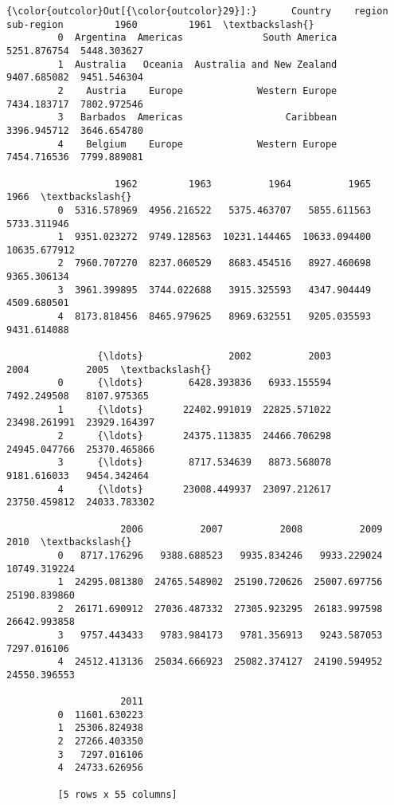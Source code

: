 \documentclass[11pt]{article}
\begin{document}
\begin{Verbatim}[commandchars=\\\{\}]
{\color{outcolor}Out[{\color{outcolor}29}]:}      Country    region                 sub-region         1960         1961  \textbackslash{}
         0  Argentina  Americas              South America  5251.876754  5448.303627   
         1  Australia   Oceania  Australia and New Zealand  9407.685082  9451.546304   
         2    Austria    Europe             Western Europe  7434.183717  7802.972546   
         3   Barbados  Americas                  Caribbean  3396.945712  3646.654780   
         4    Belgium    Europe             Western Europe  7454.716536  7799.889081   
         
                   1962         1963          1964          1965          1966  \textbackslash{}
         0  5316.578969  4956.216522   5375.463707   5855.611563   5733.311946   
         1  9351.023272  9749.128563  10231.144465  10633.094400  10635.677912   
         2  7960.707270  8237.060529   8683.454516   8927.460698   9365.306134   
         3  3961.399895  3744.022688   3915.325593   4347.904449   4509.680501   
         4  8173.818456  8465.979625   8969.632551   9205.035593   9431.614088   
         
                {\ldots}               2002          2003          2004          2005  \textbackslash{}
         0      {\ldots}        6428.393836   6933.155594   7492.249508   8107.975365   
         1      {\ldots}       22402.991019  22825.571022  23498.261991  23929.164397   
         2      {\ldots}       24375.113835  24466.706298  24945.047766  25370.465866   
         3      {\ldots}        8717.534639   8873.568078   9181.616033   9454.342464   
         4      {\ldots}       23008.449937  23097.212617  23750.459812  24033.783302   
         
                    2006          2007          2008          2009          2010  \textbackslash{}
         0   8717.176296   9388.688523   9935.834246   9933.229024  10749.319224   
         1  24295.081380  24765.548902  25190.720626  25007.697756  25190.839860   
         2  26171.690912  27036.487332  27305.923295  26183.997598  26642.993858   
         3   9757.443433   9783.984173   9781.356913   9243.587053   7297.016106   
         4  24512.413136  25034.666923  25082.374127  24190.594952  24550.396553   
         
                    2011  
         0  11601.630223  
         1  25306.824938  
         2  27266.403350  
         3   7297.016106  
         4  24733.626956  
         
         [5 rows x 55 columns]
\end{Verbatim}
            
\end{document}
